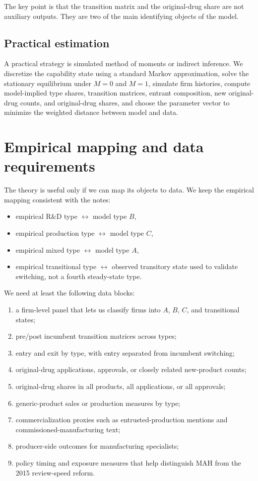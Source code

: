 \documentclass[12pt]{article}
\newcommand{\1}{\mathbf{1}}
\begin{document}
The key point is that the transition matrix and the original-drug share are not auxiliary outputs. They are two of the main identifying objects of the model.

\subsection{Practical estimation}

A practical strategy is simulated method of moments or indirect inference. We discretize the capability state using a standard Markov approximation, solve the stationary equilibrium under $M=0$ and $M=1$, simulate firm histories, compute model-implied type shares, transition matrices, entrant composition, new original-drug counts, and original-drug shares, and choose the parameter vector to minimize the weighted distance between model and data.

\section{Empirical mapping and data requirements}

The theory is useful only if we can map its objects to data. We keep the empirical mapping consistent with the notes:
\begin{itemize}[leftmargin=2em]
    \item empirical R\&D type $\leftrightarrow$ model type $B$,
    \item empirical production type $\leftrightarrow$ model type $C$,
    \item empirical mixed type $\leftrightarrow$ model type $A$,
    \item empirical transitional type $\leftrightarrow$ observed transitory state used to validate switching, not a fourth steady-state type.
\end{itemize}

We need at least the following data blocks:
\begin{enumerate}[leftmargin=2em]
    \item a firm-level panel that lets us classify firms into $A$, $B$, $C$, and transitional states;
    \item pre/post incumbent transition matrices across types;
    \item entry and exit by type, with entry separated from incumbent switching;
    \item original-drug applications, approvals, or closely related new-product counts;
    \item original-drug shares in all products, all applications, or all approvals;
    \item generic-product sales or production measures by type;
    \item commercialization proxies such as entrusted-production mentions and commissioned-manufacturing text;
    \item producer-side outcomes for manufacturing specialists;
    \item policy timing and exposure measures that help distinguish MAH from the 2015 review-speed reform.
\end{enumerate}
\end{document}
